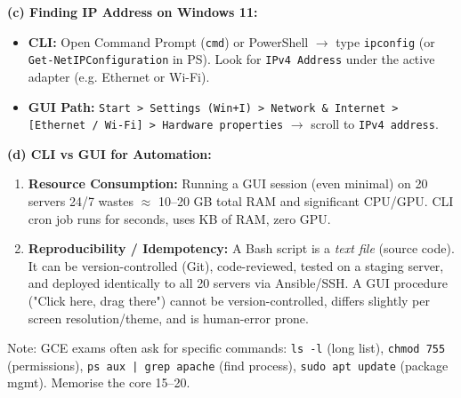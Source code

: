 \documentclass[11pt]{article}
\newcommand{\cle}[1]{{\popxbold\color{popdark}#1}}
\begin{document}
\begin{exoresolu}
\noindent\textbf{(c) Finding IP Address on Windows 11:}
\begin{itemize}
    \item \textbf{CLI:} Open Command Prompt (\texttt{cmd}) or PowerShell $\rightarrow$ type \texttt{ipconfig} (or \texttt{Get-NetIPConfiguration} in PS). Look for \texttt{IPv4 Address} under the active adapter (e.g. Ethernet or Wi-Fi).
    \item \textbf{GUI Path:} \texttt{Start > Settings (Win+I) > Network \& Internet > [Ethernet / Wi-Fi] > Hardware properties} $\rightarrow$ scroll to \texttt{IPv4 address}.
\end{itemize}

\noindent\textbf{(d) CLI vs GUI for Automation:}
\begin{enumerate}
    \item \textbf{Resource Consumption:} Running a GUI session (even minimal) on 20 servers 24/7 wastes $\approx$ 10--20 GB total RAM and significant CPU/GPU. CLI cron job runs for seconds, uses KB of RAM, zero GPU.
    \item \textbf{Reproducibility / Idempotency:} A Bash script is a \emph{text file} (source code). It can be version-controlled (Git), code-reviewed, tested on a staging server, and deployed identically to all 20 servers via Ansible/SSH. A GUI procedure ("Click here, drag there") cannot be version-controlled, differs slightly per screen resolution/theme, and is human-error prone.
\end{enumerate}

\cle{Note:} GCE exams often ask for specific commands: \texttt{ls -l} (long list), \texttt{chmod 755} (permissions), \texttt{ps aux | grep apache} (find process), \texttt{sudo apt update} (package mgmt). Memorise the core 15--20.
\end{exoresolu}
\end{document}
